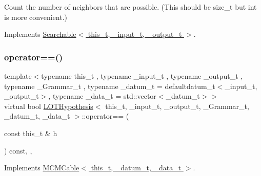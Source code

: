 Count the number of neighbors that are possible. (This should be size\+\_\+t but int is more convenient.) 



Implements \hyperlink{class_searchable_a68819cd23119615baa51d65451765c74}{Searchable$<$ this\+\_\+t, \+\_\+input\+\_\+t, \+\_\+output\+\_\+t $>$}.

\mbox{\label{class_l_o_t_hypothesis_a0b157edae49758c4159a196e8a458fa7}} 
\subsubsection{\texorpdfstring{operator==()}{operator==()}}
{\footnotesize\ttfamily template$<$typename this\+\_\+t , typename \+\_\+input\+\_\+t , typename \+\_\+output\+\_\+t , typename \+\_\+\+Grammar\+\_\+t , typename \+\_\+datum\+\_\+t  = defaultdatum\+\_\+t$<$\+\_\+input\+\_\+t, \+\_\+output\+\_\+t$>$, typename \+\_\+data\+\_\+t  = std\+::vector$<$\+\_\+datum\+\_\+t$>$$>$ \\
virtual bool \hyperlink{class_l_o_t_hypothesis}{L\+O\+T\+Hypothesis}$<$ this\+\_\+t, \+\_\+input\+\_\+t, \+\_\+output\+\_\+t, \+\_\+\+Grammar\+\_\+t, \+\_\+datum\+\_\+t, \+\_\+data\+\_\+t $>$\+::operator== (\begin{DoxyParamCaption}\item[{const this\+\_\+t \&}]{h }\end{DoxyParamCaption}) const\hspace{0.3cm}{\ttfamily [inline]}, {\ttfamily [override]}, {\ttfamily [virtual]}}



Implements \hyperlink{class_m_c_m_cable_a7b35c04d3d1326b930cfc69dfe0bd207}{M\+C\+M\+Cable$<$ this\+\_\+t, \+\_\+datum\+\_\+t, \+\_\+data\+\_\+t $>$}.

\mbox{\label{class_l_o_t_hypothesis_a46846c5e7d9767429ad5c90c0a53838c}} 
